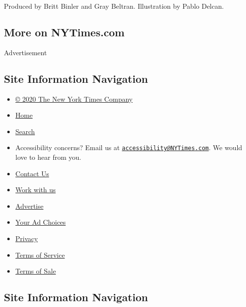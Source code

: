 Produced by Britt Binler and Gray Beltran. Illustration by Pablo Delcan.

\hypertarget{more-on-nytimescom}{%
\subsection{More on NYTimes.com}\label{more-on-nytimescom}}

Advertisement

\hypertarget{site-information-navigation}{%
\subsection{Site Information
Navigation}\label{site-information-navigation}}

\begin{itemize}
\tightlist
\item
  \href{https://help.nytimes3xbfgragh.onion/hc/en-us/articles/115014792127-Copyright-notice}{©
  2020 The New York Times Company}
\item
  \href{https://www.nytimes3xbfgragh.onion}{Home}
\item
  \href{https://www.nytimes3xbfgragh.onion/search/}{Search}
\item
  Accessibility concerns? Email us at
  \href{mailto:accessibility@NYTimes.com}{\nolinkurl{accessibility@NYTimes.com}}.
  We would love to hear from you.
\item
  \href{https://help.nytimes3xbfgragh.onion/hc/en-us/articles/115015385887-Contact-Us}{Contact
  Us}
\item
  \href{https://www.nytco.com/careers/}{Work with us}
\item
  \href{https://nytmediakit.com/}{Advertise}
\item
  \href{https://help.nytimes3xbfgragh.onion/hc/en-us/articles/115014892108-Privacy-policy\#pp}{Your
  Ad Choices}
\item
  \href{https://help.nytimes3xbfgragh.onion/hc/en-us/articles/115014892108-Privacy-policy}{Privacy}
\item
  \href{https://help.nytimes3xbfgragh.onion/hc/en-us/articles/115014893428-Terms-of-service}{Terms
  of Service}
\item
  \href{https://help.nytimes3xbfgragh.onion/hc/en-us/articles/115014893968-Terms-of-sale}{Terms
  of Sale}
\end{itemize}

\hypertarget{site-information-navigation-1}{%
\subsection{Site Information
Navigation}\label{site-information-navigation-1}}

